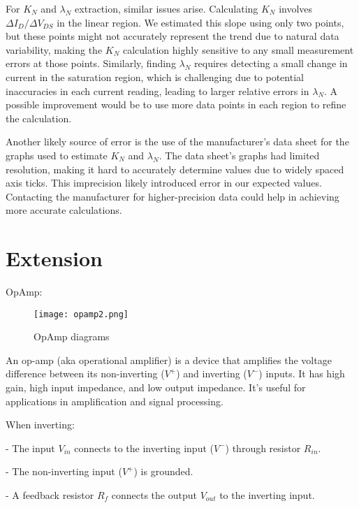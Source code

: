 \documentclass[12pt]{article}
\begin{document}
\begin{enumerate}
For \( K_N \) and \( \lambda_N \) extraction, similar issues arise. Calculating \( K_N \) involves \( \Delta I_D / \Delta V_{DS} \) in the linear region. We estimated this slope using only two points, but these points might not accurately represent the trend due to natural data variability, making the \( K_N \) calculation highly sensitive to any small measurement errors at those points. Similarly, finding \( \lambda_N \) requires detecting a small change in current in the saturation region, which is challenging due to potential inaccuracies in each current reading, leading to larger relative errors in \( \lambda_N \). A possible improvement would be to use more data points in each region to refine the calculation.

Another likely source of error is the use of the manufacturer’s data sheet for the graphs used to estimate \( K_N \) and \( \lambda_N \). The data sheet’s graphs had limited resolution, making it hard to accurately determine values due to widely spaced axis ticks. This imprecision likely introduced error in our expected values. Contacting the manufacturer for higher-precision data could help in achieving more accurate calculations.

\end{enumerate}

\section{Extension}

OpAmp:

\begin{figure}[h]
    \centering
    \texttt{[image: opamp2.png]}
    \caption{OpAmp diagrams}
    \label{fig:opamp}
\end{figure}

An op-amp (aka operational amplifier) is a device that amplifies the voltage difference between its non-inverting 
(\( V^+ \)) and inverting (\( V^- \)) inputs. 
It has high gain, high input impedance, and low output impedance. 
It's useful for applications in amplification and signal processing.

When inverting:

- The input \( V_{in} \) connects to the inverting input (\( V^- \)) through resistor \( R_{in} \).

- The non-inverting input (\( V^+ \)) is grounded.

- A feedback resistor \( R_f \) connects the output \( V_{out} \) to the inverting input.
\end{document}
